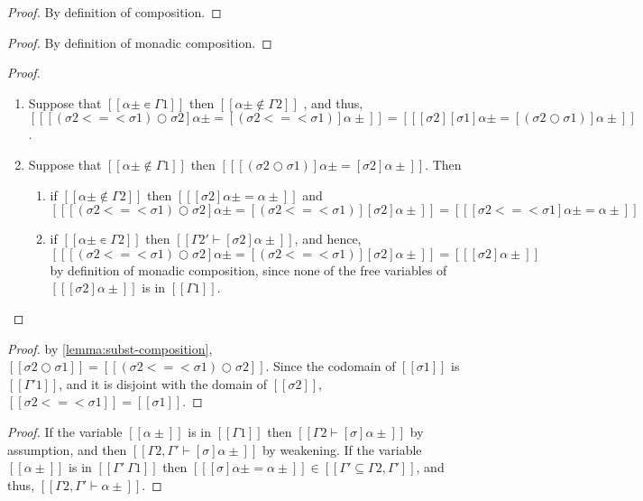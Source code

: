 \lemmaSubstCompWell*
\begin{proof}
    By definition of composition.
\end{proof}

\lemmaSubstMonadCompWell*
\begin{proof}
  By definition of monadic composition. 
\end{proof}

\lemmaSubstComp*
\begin{proof}
  \hfill
  \begin{enumerate}
    \item Suppose that $[[α± ∊ Γ1]]$ then $[[α± ∉ Γ2]]$ , and thus, 
      $[[ [(σ2 <=< σ1) ○ σ2]α± = [(σ2 <=< σ1)]α± ]] = [[ [σ2][σ1]α± = [(σ2 ○ σ1)]α± ]]$.
    \item Suppose that $[[α± ∉ Γ1]]$ then $[[ [(σ2 ○ σ1)]α± = [σ2]α± ]]$.  Then 
    \begin{enumerate}
      \item if $[[α± ∉ Γ2]]$ then $[[ [σ2]α± = α± ]]$ and 
        $[[ [(σ2 <=< σ1) ○ σ2]α± = [(σ2 <=< σ1)][σ2]α±]] = [[ [σ2 <=< σ1]α± = α± ]]$
      \item if  $[[α± ∊ Γ2]]$ then $[[ Γ2' ⊢ [σ2]α±  ]]$, and hence, 
        $[[ [(σ2 <=< σ1) ○ σ2]α±  = [(σ2 <=< σ1)][σ2]α±]] = [[ [σ2]α± ]]$
        by definition of monadic composition, since 
        none of the free variables of  $[[ [σ2]α± ]]$ is in $[[Γ1]]$.
    \end{enumerate}
  \end{enumerate}
\end{proof}

\corollarySubstCompCumm*
\begin{proof}
  by \cref{lemma:subst-composition},
    $[[ σ2 ○ σ1 ]] = [[ (σ2 <=< σ1) ○ σ2 ]]$.
    Since the codomain of $[[σ1]]$ is $[[Γ'1]]$,
    and it is disjoint with the domain of $[[σ2]]$,
    $[[σ2 <=< σ1]] = [[σ1]]$.
\end{proof}

\lemmaSubstDomWeak*
\begin{proof}
  If the variable $[[α±]]$ is in $[[Γ1]]$ then $[[Γ2 ⊢ [σ]α± ]]$ by assumption,
  and then $[[Γ2, Γ' ⊢ [σ]α± ]]$ by weakening.
  If the variable $[[α±]]$ is in $[[Γ' \ Γ1]]$ then $[[ [σ]α± = α± ]] \in [[Γ' ⊆ Γ2, Γ']]$, 
  and thus, $[[Γ2, Γ' ⊢ α± ]]$.
\end{proof}

